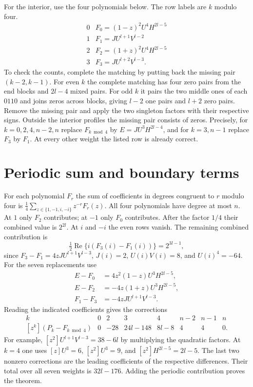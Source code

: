 \documentclass[11pt]{article}
\begin{document}
For the interior, use the four polynomials below. The row labels are $k$ modulo four.
\[
\begin{array}{c|l}
0&F_0=(1-z)^2U^4H^{2l-5}\\
1&F_1=JU^{l+1}V^{l-2}\\
2&F_2=(1+z)^2U^4H^{2l-5}\\
3&F_3=JU^{l+2}V^{l-3}.
\end{array}
\]
To check the counts, complete the matching by putting back the missing pair $(k-2,k-1)$. For even $k$ the complete matching has four zero pairs from the end blocks and $2l-4$ mixed pairs. For odd $k$ it pairs the two middle ones of each $0110$ and joins zeros across blocks, giving $l-2$ one pairs and $l+2$ zero pairs. Remove the missing pair and apply the two singleton factors with their respective signs. Outside the interior profiles the missing pair consists of zeros. Precisely, for $k=0,2,4,n-2,n$ replace $F_{k\bmod4}$ by $E=JU^3H^{2l-4}$, and for $k=3,n-1$ replace $F_3$ by $F_1$. At every other weight the listed row is already correct.

\section{Periodic sum and boundary terms}
For each polynomial $F_r$ the sum of coefficients in degrees congruent to $r$ modulo four is $\tfrac14\sum_{z\in\{1,-1,i,-i\}}z^{-r}F_r(z)$. All four polynomials have degree at most $n$. At $1$ only $F_2$ contributes; at $-1$ only $F_0$ contributes. After the factor $1/4$ their combined value is $2^{2l}$. At $i$ and $-i$ the even rows vanish. The remaining combined contribution is
\[
 \tfrac12\operatorname{Re}\{i(F_3(i)-F_1(i))\}=2^{3l-1},
\]
since $F_3-F_1=4zJU^{l+1}V^{l-3}$, $J(i)=2$, $U(i)V(i)=8$, and $U(i)^4=-64$.
For the seven replacements use
\[
\begin{aligned}
 E-F_0 &=4z^2(1-z)U^3H^{2l-5},\\
 E-F_2 &=-4z(1+z)U^3H^{2l-5},\\
 F_1-F_3 &=-4zJU^{l+1}V^{l-3}.
\end{aligned}
\]
Reading the indicated coefficients gives the corrections
\[
\begin{array}{c|rrrrrrr}
 k&0&2&3&4&n-2&n-1&n\\\hline
 [z^k](P_k-F_{k\bmod4})&0&-28&24l-148&8l-8&4&4&0 .
\end{array}
\]
For example, $[z^2]U^{l+1}V^{l-3}=38-6l$ by multiplying the quadratic factors. At $k=4$ one uses $[z]U^3=6$, $[z^2]U^3=9$, and $[z^2]H^{2l-5}=2l-5$. The last two nonzero corrections are the leading coefficients of the respective differences. Their total over all seven weights is $32l-176$. Adding the periodic contribution proves the theorem.
\end{document}
